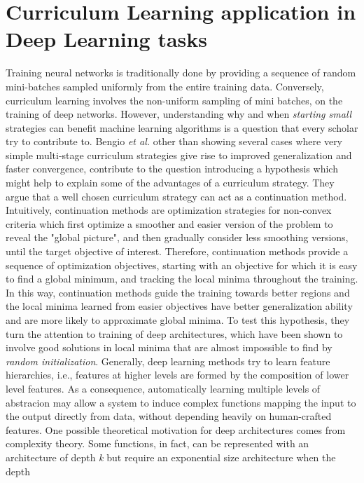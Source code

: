 \section{Curriculum Learning application in Deep Learning tasks}
Training neural networks is traditionally done by providing a sequence of 
random mini-batches sampled uniformly from the entire training data. Conversely, curriculum learning
involves the non-uniform sampling of mini batches, on the training of deep networks.
However, understanding why and when \textit{starting small} strategies can 
benefit machine learning algorithms is a question that every scholar try to contribute to.
Bengio \textit{et al.} \cite{bengio2009curriculum} other than showing several cases where very simple
multi-stage curriculum strategies give rise to improved generalization and faster convergence, 
contribute to the question introducing a hypothesis which might help to explain 
some of the advantages of a curriculum strategy. They argue that a well chosen curriculum 
strategy can act as a continuation method. Intuitively, continuation methods are optimization
strategies for non-convex criteria which first optimize a smoother and easier version of the problem to 
reveal the "global picture", and then gradually consider less smoothing versions, until the target objective of 
interest. Therefore, continuation methods provide a sequence of optimization objectives, starting with an objective for which
it is easy to find a global minimum, and tracking the local minima throughout the training. In this way, continuation methods
guide the training towards better regions  and the local minima learned from easier objectives have better
generalization ability and are more likely to approximate global minima.
To test this hypothesis, they turn the attention to training of deep
architectures, which have been shown to involve good solutions in local minima that are almost impossible to find 
by \textit{random initialization}. Generally, deep learning methods try 
to learn feature hierarchies, i.e., features at higher levels are formed by the composition of lower level features.
As a consequence, automatically learning multiple levels of abstracion may allow a system to induce complex functions mapping the input to the 
output directly from data, without depending heavily on human-crafted features.
One possible theoretical motivation for deep architectures comes from complexity theory. Some functions, in fact, can 
be represented with an architecture of depth \textit{k} but require an exponential size architecture when the depth 
